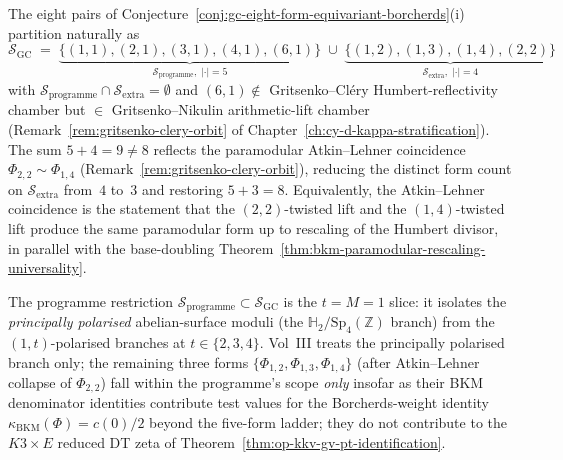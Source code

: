 \begin{remark}
\label{rem:gc-eight-form-five-three-partition}
The eight pairs of
Conjecture~\ref{conj:gc-eight-form-equivariant-borcherds}(i)
partition naturally as
\[
 \mathcal{S}_{\mathrm{GC}}
 \;=\;
 \underbrace{\bigl\{(1, 1), (2, 1), (3, 1), (4, 1), (6, 1)\bigr\}}_{\mathcal{S}_{\mathrm{programme}}, \;|\cdot| = 5}
 \;\cup\;
 \underbrace{\bigl\{(1, 2), (1, 3), (1, 4), (2, 2)\bigr\}}_{\mathcal{S}_{\mathrm{extra}}, \;|\cdot| = 4}
\]
with $\mathcal{S}_{\mathrm{programme}} \cap \mathcal{S}_{\mathrm{extra}}
= \emptyset$ and $(6, 1) \notin $ Gritsenko--Cl\'ery Humbert-reflectivity
chamber but $\in $ Gritsenko--Nikulin arithmetic-lift chamber
(Remark~\ref{rem:gritsenko-clery-orbit} of
Chapter~\ref{ch:cy-d-kappa-stratification}). The sum
$5 + 4 = 9 \neq 8$ reflects the paramodular Atkin--Lehner coincidence
$\Phi_{2, 2} \sim \Phi_{1, 4}$
(Remark~\ref{rem:gritsenko-clery-orbit}), reducing the distinct form
count on $\mathcal{S}_{\mathrm{extra}}$ from~$4$ to~$3$ and restoring
$5 + 3 = 8$. Equivalently, the Atkin--Lehner coincidence is the
statement that the $(2, 2)$-twisted lift and the $(1, 4)$-twisted lift
produce the same paramodular form up to rescaling of the Humbert
divisor, in parallel with the base-doubling
Theorem~\ref{thm:bkm-paramodular-rescaling-universality}.

The programme restriction
$\mathcal{S}_{\mathrm{programme}} \subset \mathcal{S}_{\mathrm{GC}}$
is the $t = M = 1$ slice: it isolates the \emph{principally polarised}
abelian-surface moduli (the $\mathbb{H}_2/\mathrm{Sp}_4(\mathbb{Z})$
branch) from the $(1, t)$-polarised branches at $t \in \{2, 3, 4\}$.
Vol~III treats the principally polarised branch only; the remaining
three forms $\{\Phi_{1, 2}, \Phi_{1, 3}, \Phi_{1, 4}\}$ (after
Atkin--Lehner collapse of $\Phi_{2, 2}$) fall within the programme's
scope \emph{only} insofar as their BKM denominator identities
contribute test values for the Borcherds-weight identity
$\kappa_{\mathrm{BKM}}(\Phi) = c(0)/2$ beyond the five-form ladder;
they do not contribute to the $K3 \times E$ reduced DT zeta of
Theorem~\ref{thm:op-kkv-gv-pt-identification}.
\end{remark}

